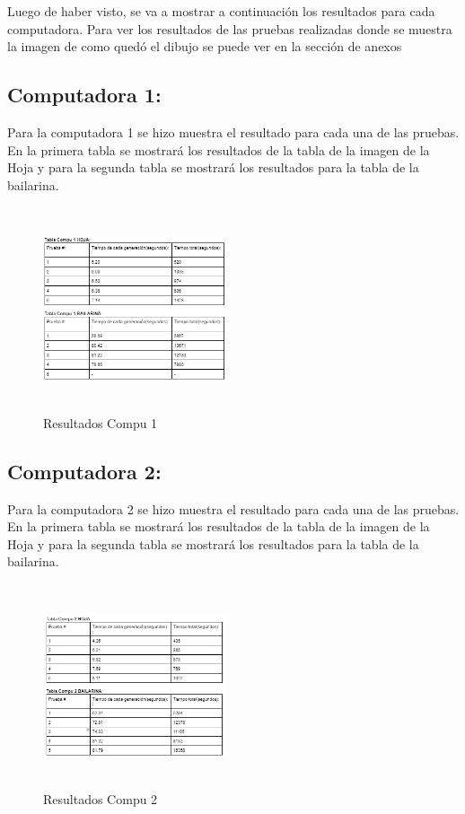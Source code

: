 \documentclass[conference]{IEEEtran}
\begin{document}
Luego de haber visto, se va a mostrar a continuación los resultados para cada computadora. Para ver los resultados de las pruebas realizadas donde se muestra la imagen de como quedó el dibujo se puede ver en la sección de anexos

\subsection{Computadora 1:}
Para la computadora 1 se hizo muestra el resultado para cada una de las pruebas. En la primera tabla se mostrará los resultados de la tabla de la imagen de la Hoja y para la segunda tabla se mostrará los resultados para la tabla de la bailarina. 

\begin{figure}[h]
    \centering
    \includegraphics[width=0.480\textwidth, height=6cm]{tabla compu 1.png} 
    \caption{Resultados Compu 1}
    \label{fig:mi_imagen}
\end{figure}



\subsection{Computadora 2:}
Para la computadora 2 se hizo muestra el resultado para cada una de las pruebas. En la primera tabla se mostrará los resultados de la tabla de la imagen de la Hoja y para la segunda tabla se mostrará los resultados para la tabla de la bailarina. 


\begin{figure}[h]
    \centering
    \includegraphics[width=0.480\textwidth, height=6cm]{tabla compu 2.png} 
    \caption{Resultados Compu 2}
    \label{fig:mi_imagen}
\end{figure}
\end{document}
